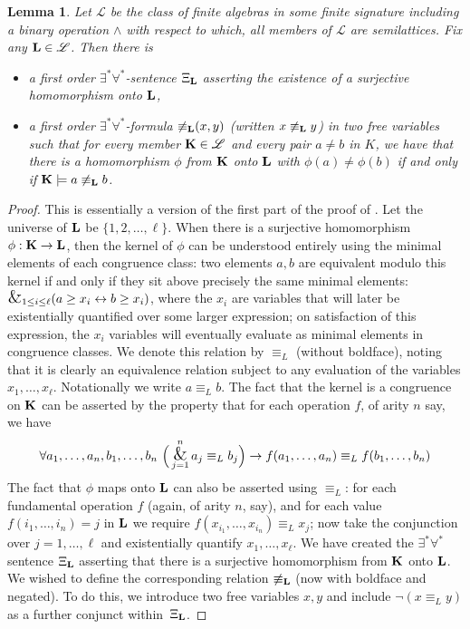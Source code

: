 \documentclass[reqno]{amsart}
\theoremstyle{plain}
\newtheorem{lem}[thm]{Lemma}
\theoremstyle{definition}
\newcommand{\up}[1]{\textup{#1}}
\newcommand{\bigand}{\operatornamewithlimits{\hbox{\Large$\&$}}}
\begin{document}
\begin{lem}\label{lem:onto}
Let $\mathscr{L}$ be the class of finite algebras in some finite signature including a binary operation $\wedge$ with respect to which, all members of $\mathscr{L}$ are semilattices.  Fix any ${\bf L}\in\mathscr{L}$.  Then there is
\begin{itemize}
\item a first order $\exists^*\forall^*$-sentence $\Xi_{\bf L}$ asserting the existence of a surjective homomorphism onto ${\bf L}$,
\item a first order $\exists^*\forall^*$-formula ${\not\equiv_{\bf L}}(x,y)$ \up(written $x\not\equiv_{\bf L}y$\up) in two free variables such that for every member ${\bf K}\in\mathscr{L}$ and every pair $a\neq b$ in  $K$, we have that there is a homomorphism $\phi$ from ${\bf K}$ onto ${\bf L}$ with $\phi(a)\neq \phi(b)$ if and only if ${\bf K}\models a\not\equiv_{\bf L}b$.
\end{itemize}
\end{lem}
\begin{proof}
This is essentially a version of the first part of the proof of \cite[Theorem~4.2]{CDJP}.  Let the universe of ${\bf L}$ be $\{1,2,\dots,\ell\}$.  When there is a surjective homomorphism $\phi:{\bf K}\to {\bf L}$, then the kernel of $\phi$ can be understood entirely using the minimal elements of each congruence class: two elements $a,b$ are equivalent modulo this kernel if and only if they sit above precisely the same minimal elements: $\bigand_{1\leq i\leq \ell} (a\geq x_i\leftrightarrow b\geq x_i)$, where the $x_i$ are variables that  will later be existentially quantified over some larger expression; on satisfaction of this expression, the $x_i$ variables will eventually evaluate as minimal elements in congruence classes.  We denote this relation by $\equiv_L$ (without boldface), noting that it is clearly an equivalence relation subject to any evaluation of the variables $x_1,\dots,x_\ell$.  Notationally we write $a\equiv_L b$.  The fact that the kernel is a congruence on ${\bf K}$ can be asserted by the property that for each operation $f$, of arity $n$ say, we have
\[
\forall a_1,\dots,a_n,b_1,\dots,b_n\ \Big(\bigand_{j=1}^n a_j\equiv_L b_j\Big)\rightarrow f(a_1,\dots,a_n)\equiv_L f(b_1,\dots,b_n)
\]
The fact that $\phi$ maps onto ${\bf L}$ can also be asserted using $\equiv_L$: for each fundamental operation $f$ (again, of arity $n$, say), and for each value $f(i_1,\dots,i_n)=j$ in ${\bf L}$ we require $f(x_{i_1},\dots,x_{i_n})\equiv_L x_j$; now take the conjunction over $j=1,\dots,\ell$ and existentially quantify $x_1,\dots,x_\ell$.
We have created the $\exists^*\forall^*$ sentence $\Xi_{\bf L}$ asserting that there is a surjective homomorphism from ${\bf K}$ onto ${\bf L}$. 
We wished to define the corresponding relation $\not\equiv_{\bf L}$ (now with boldface and negated).  To do this, we introduce two free variables $x,y$ and include $\neg(x\equiv_L y)$ as a further conjunct within~$\Xi_{\bf L}$.
\end{proof}
\end{document}
